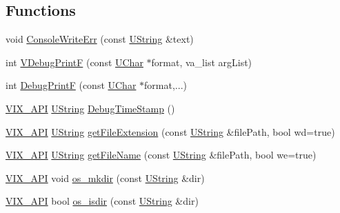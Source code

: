 \subsection*{Functions}
\begin{DoxyCompactItemize}
\item 
void \hyperlink{namespaceVixen_ae5d8286e89335780589abef43cffe82b}{Console\+Write\+Err} (const \hyperlink{vix__stringutil_8h_a561c282c415a5c38fd9a26325701e3bf}{U\+String} \&text)
\item 
int \hyperlink{namespaceVixen_a98ec16e2cd362c7bc44690a5197c6c1e}{V\+Debug\+Print\+F} (const \hyperlink{vix__stringutil_8h_adc2ae6d46e5cd3718f5446c8d2a2c5ac}{U\+Char} $\ast$format, va\+\_\+list arg\+List)
\item 
int \hyperlink{namespaceVixen_acedf76acc71be060abeab28f299d1314}{Debug\+Print\+F} (const \hyperlink{vix__stringutil_8h_adc2ae6d46e5cd3718f5446c8d2a2c5ac}{U\+Char} $\ast$format,...)
\item 
\hyperlink{vix__platform_8h_afdaa33aa7411dace34f16eb161ffaf35}{V\+I\+X\+\_\+\+A\+P\+I} \hyperlink{vix__stringutil_8h_a561c282c415a5c38fd9a26325701e3bf}{U\+String} \hyperlink{namespaceVixen_a2ad0f14ebc1c95e994a11867d2daf6cf}{Debug\+Time\+Stamp} ()
\item 
\hyperlink{vix__platform_8h_afdaa33aa7411dace34f16eb161ffaf35}{V\+I\+X\+\_\+\+A\+P\+I} \hyperlink{vix__stringutil_8h_a561c282c415a5c38fd9a26325701e3bf}{U\+String} \hyperlink{namespaceVixen_af23964b344031d71c4cf7e9f45960416}{get\+File\+Extension} (const \hyperlink{vix__stringutil_8h_a561c282c415a5c38fd9a26325701e3bf}{U\+String} \&file\+Path, bool wd=true)
\item 
\hyperlink{vix__platform_8h_afdaa33aa7411dace34f16eb161ffaf35}{V\+I\+X\+\_\+\+A\+P\+I} \hyperlink{vix__stringutil_8h_a561c282c415a5c38fd9a26325701e3bf}{U\+String} \hyperlink{namespaceVixen_ab901825efc373f2e098582164cae28f3}{get\+File\+Name} (const \hyperlink{vix__stringutil_8h_a561c282c415a5c38fd9a26325701e3bf}{U\+String} \&file\+Path, bool we=true)
\item 
\hyperlink{vix__platform_8h_afdaa33aa7411dace34f16eb161ffaf35}{V\+I\+X\+\_\+\+A\+P\+I} void \hyperlink{namespaceVixen_a4a37f3800c98f3e543a147281c755a3b}{os\+\_\+mkdir} (const \hyperlink{vix__stringutil_8h_a561c282c415a5c38fd9a26325701e3bf}{U\+String} \&dir)
\item 
\hyperlink{vix__platform_8h_afdaa33aa7411dace34f16eb161ffaf35}{V\+I\+X\+\_\+\+A\+P\+I} bool \hyperlink{namespaceVixen_aba11616d2c0a99f62f71b49ac63692bb}{os\+\_\+isdir} (const \hyperlink{vix__stringutil_8h_a561c282c415a5c38fd9a26325701e3bf}{U\+String} \&dir)

\end{DoxyCompactItemize}
